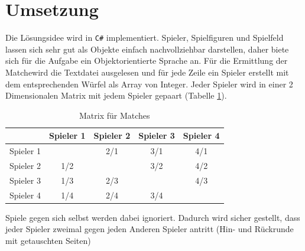 \documentclass[a4paper,11pt,ngerman]{scrartcl}
\begin{document}
\section{Umsetzung}
Die Lösungsidee wird in \texttt{C\#} implementiert. Spieler, Spielfiguren und Spielfeld lassen sich sehr gut als Objekte einfach nachvollziehbar darstellen, daher biete sich für die Aufgabe ein Objektorientierte Sprache an. Für die Ermittlung der \glqq Matche\grqq wird die Textdatei ausgelesen und für jede Zeile ein Spieler erstellt mit dem entsprechenden Würfel als Array von Integer. Jeder Spieler wird in einer 2 Dimensionalen Matrix mit jedem Spieler gepaart (Tabelle \ref{table:Matrix}).
\begin{table}	
	\centering
	\begin{tabular}{|c|c|c|c|c|}	
		\hline
		& Spieler 1 & Spieler 2 & Spieler 3 & Spieler 4\\
		\hline

		Spieler 1 &\cellcolor{mygray}& 2/1 & 3/1 & 4/1 \\	
\hline
		Spieler 2 & 1/2 & \cellcolor{mygray} & 3/2 & 4/2 \\
\hline
		Spieler 3 & 1/3 & 2/3 &\cellcolor{mygray}& 4/3 \\
\hline
		Spieler 4 & 1/4 & 2/4 & 3/4 & \cellcolor{mygray} \\
		\hline
	\end{tabular}
	\caption{Matrix für Matches}
	\label{table:Matrix}
\end{table}
Spiele gegen sich selbst werden dabei ignoriert. Dadurch wird sicher gestellt, dass jeder Spieler zweimal gegen jeden Anderen Spieler antritt (Hin- und Rückrunde mit getauschten Seiten)
\end{document}
